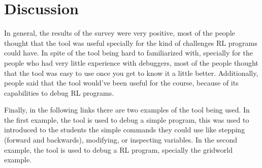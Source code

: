 
\section{Discussion}
\label{sec:discussion}

In general, the results of the survey were very positive, most of the people thought that 
the tool was useful specially for the kind of challenges \ac{RL} programs could have. In 
spite of the tool being hard to familiarized with, specially for the people who had very 
little experience with debuggers, most of the people thought that the tool was easy to use 
once you get to know it a little better. Additionally, people said that the tool would've 
been useful for the course, because of its capabilities to debug \ac{RL} programs.

Finally, in the following links there are two examples of the tool being used. In the first 
example, the tool is used to debug a simple program, this was used to introduced to the students 
the simple commands they could use like stepping (forward and backwards), modifying, or inspecting 
variables. In the second example, the tool is used to debug a \ac{RL} program, specially 
the gridworld example.

\endinput

